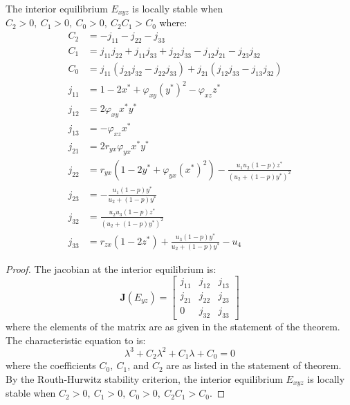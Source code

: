 \begin{theorem}\label{thm:interior-stability}
    The interior equilibrium $E_{xyz}$ is locally stable when $C_2>0,\ C_1>0,\ C_0>0,\ C_2C_1>C_0$ where:
    \begin{align*}
        C_2 &= -j_{11}-j_{22}-j_{33}\\
        C_1 &= j_{11}j_{22}+j_{11}j_{33}+j_{22}j_{33}-j_{12}j_{21}-j_{23}j_{32}\\
        C_0 &= j_{11}\left(j_{23}j_{32}-j_{22}j_{33}\right)+j_{21}\left(j_{12}j_{33}-j_{13}j_{32}\right)\\
        j_{11} &= 1-2x^*+\varphi_{xy}\left(y^*\right)^2-\varphi_{xz}z^*\\
        j_{12} &= 2\varphi_{xy}x^*y^*\\
        j_{13} &= -\varphi_{xz}x^*\\
        j_{21} &= 2r_{yx}\varphi_{yx}x^*y^*\\
        j_{22} &= r_{yx}\left(1-2y^*+\varphi_{yx}\left(x^*\right)^2\right)-\frac{u_1u_2\left(1-p\right)z^*}{\left(u_2+\left(1-p\right)y^*\right)^2}\\
        j_{23} &= -\frac{u_1\left(1-p\right)y^*}{u_2+\left(1-p\right)y^*}\\
        j_{32} &= \frac{u_2u_3\left(1-p\right)z^*}{\left(u_2+\left(1-p\right)y^*\right)^2}\\
        j_{33} &= r_{zx}\left(1-2z^*\right)+\frac{u_3\left(1-p\right)y^*}{u_2+\left(1-p\right)y^*}-u_4
    \end{align*}
\end{theorem}
\begin{proof}
    The jacobian at the interior equilibrium is:
    \begin{equation}\label{matrix:jacobian-interior}
        \textbf{J}\left(E_{yz}\right) = \begin{bmatrix}
            j_{11} & j_{12} & j_{13}\\
            j_{21} & j_{22} & j_{23}\\
            0 & j_{32} & j_{33}
        \end{bmatrix}
    \end{equation}
    where the elements of the matrix are as given in the statement of the theorem. The characteristic equation to  is:
    \begin{equation*}\label{eq:char-eq-interior}
        \lambda^3+C_2\lambda^2+C_1\lambda+C_0=0
    \end{equation*}
    where the coefficients $C_0,\ C_1$, and $C_2$ are as listed in the statement of theorem. By the Routh-Hurwitz stability criterion, the interior equilibrium $E_{xyz}$ is locally stable when $C_2>0,\ C_1>0,\ C_0>0,\ C_2C_1>C_0$.
\end{proof}

